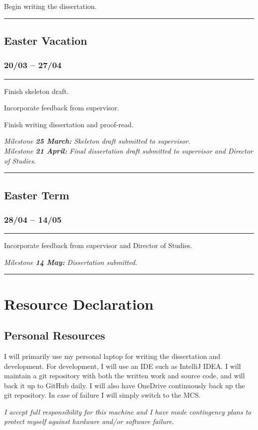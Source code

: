 \documentclass[a4paper,12pt]{article}
\begin{document}
\noindent
Begin writing the dissertation.\\
\hrule

\subsection*{Easter Vacation}
\subsubsection*{20/03 -- 27/04}\hrule
Finish skeleton draft.

\noindent
Incorporate feedback from supervisor.

\noindent
Finish writing dissertation and proof-read.

\noindent
\textit{Milestone \textbf{25 March:} Skeleton draft submitted to supervisor.}\\
\textit{Milestone \textbf{21 April:} Final dissertation draft submitted to supervisor and Director of Studies.}\\
\hrule

\subsection*{Easter Term} \nopagebreak
\subsubsection*{28/04 -- 14/05}\hrule \nopagebreak
Incorporate feedback from supervisor and Director of Studies. \nopagebreak

\noindent
\textit{Milestone \textbf{14 May:} Dissertation submitted.}\\
\hrule


\section{Resource Declaration}
\subsection*{Personal Resources}
I will primarily use my personal laptop for writing the dissertation and development. For development, I will use an IDE such as IntelliJ IDEA. I will maintain a git repository with both the written work and source code, and will back it up to GitHub daily. I will also have OneDrive continuously back up the git repository. In case of failure I will simply switch to the MCS.

\textit{I accept full responsibility for this machine and I have made contingency plans to protect myself against hardware and/or software failure.}
\end{document}

